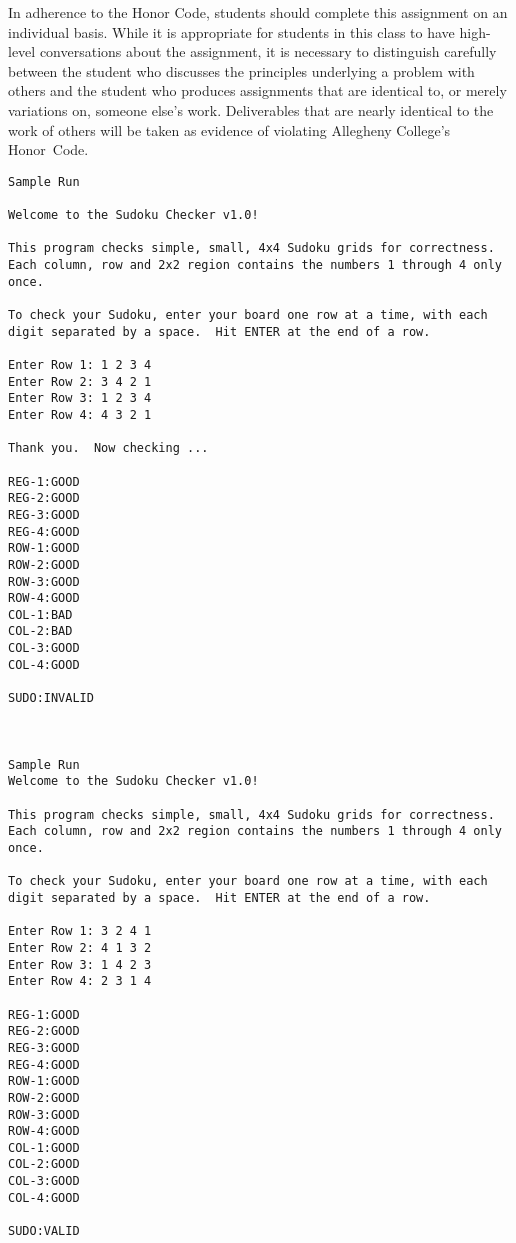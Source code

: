 In adherence to the Honor Code, students should complete this assignment on an individual basis. While it is appropriate
for students in this class to have high-level conversations about the assignment, it is necessary to distinguish
carefully between the student who discusses the principles underlying a problem with others and the student who produces
assignments that are identical to, or merely variations on, someone else's work.  Deliverables that are nearly identical
to the work of others will be taken as evidence of violating Allegheny College's \mbox{Honor Code}.



\begin{verbatim}
Sample Run

Welcome to the Sudoku Checker v1.0!

This program checks simple, small, 4x4 Sudoku grids for correctness. Each column, row and 2x2 region contains the numbers 1 through 4 only once.

To check your Sudoku, enter your board one row at a time, with each digit separated by a space.  Hit ENTER at the end of a row.

Enter Row 1: 1 2 3 4
Enter Row 2: 3 4 2 1
Enter Row 3: 1 2 3 4
Enter Row 4: 4 3 2 1

Thank you.  Now checking ...

REG-1:GOOD
REG-2:GOOD
REG-3:GOOD
REG-4:GOOD
ROW-1:GOOD
ROW-2:GOOD
ROW-3:GOOD
ROW-4:GOOD
COL-1:BAD
COL-2:BAD
COL-3:GOOD
COL-4:GOOD

SUDO:INVALID



Sample Run
Welcome to the Sudoku Checker v1.0!

This program checks simple, small, 4x4 Sudoku grids for correctness. Each column, row and 2x2 region contains the numbers 1 through 4 only once.

To check your Sudoku, enter your board one row at a time, with each digit separated by a space.  Hit ENTER at the end of a row.

Enter Row 1: 3 2 4 1
Enter Row 2: 4 1 3 2
Enter Row 3: 1 4 2 3
Enter Row 4: 2 3 1 4

REG-1:GOOD
REG-2:GOOD
REG-3:GOOD
REG-4:GOOD
ROW-1:GOOD
ROW-2:GOOD
ROW-3:GOOD
ROW-4:GOOD
COL-1:GOOD
COL-2:GOOD
COL-3:GOOD
COL-4:GOOD

SUDO:VALID

\end{verbatim}




